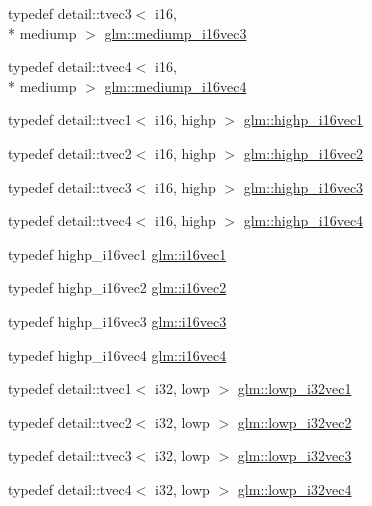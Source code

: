 \begin{DoxyCompactItemize}
\item 
typedef detail\-::tvec3$<$ i16, \\*
mediump $>$ \hyperlink{group__gtc__type__precision_gad9e470f707da812fe454505c99035471}{glm\-::mediump\-\_\-i16vec3}
\item 
typedef detail\-::tvec4$<$ i16, \\*
mediump $>$ \hyperlink{group__gtc__type__precision_gad9aca299fc3e96c84be6b063381c9f3e}{glm\-::mediump\-\_\-i16vec4}
\item 
typedef detail\-::tvec1$<$ i16, highp $>$ \hyperlink{group__gtc__type__precision_ga0ed3103e2d3acb4efbe313add4243a72}{glm\-::highp\-\_\-i16vec1}
\item 
typedef detail\-::tvec2$<$ i16, highp $>$ \hyperlink{group__gtc__type__precision_ga74df9e215c049f82d277473c4c974bb4}{glm\-::highp\-\_\-i16vec2}
\item 
typedef detail\-::tvec3$<$ i16, highp $>$ \hyperlink{group__gtc__type__precision_ga8dcfd412bd9ce99a1cf5c2b6e50f07e7}{glm\-::highp\-\_\-i16vec3}
\item 
typedef detail\-::tvec4$<$ i16, highp $>$ \hyperlink{group__gtc__type__precision_ga7fd6f1b3c224833cc330a2c64b6994dd}{glm\-::highp\-\_\-i16vec4}
\item 
typedef highp\-\_\-i16vec1 \hyperlink{group__gtc__type__precision_gaa3a2fe05ca6a7086c5580922ebda4bf3}{glm\-::i16vec1}
\item 
typedef highp\-\_\-i16vec2 \hyperlink{group__gtc__type__precision_ga13f7a88281faec6a72231dce73ce6129}{glm\-::i16vec2}
\item 
typedef highp\-\_\-i16vec3 \hyperlink{group__gtc__type__precision_ga22ec113d49837ef823048bb01511564c}{glm\-::i16vec3}
\item 
typedef highp\-\_\-i16vec4 \hyperlink{group__gtc__type__precision_ga28cd96ac55e2209bdbd3a41cb8af970a}{glm\-::i16vec4}
\item 
typedef detail\-::tvec1$<$ i32, lowp $>$ \hyperlink{group__gtc__type__precision_gadb82f1c8a0f4d3304862d32079961974}{glm\-::lowp\-\_\-i32vec1}
\item 
typedef detail\-::tvec2$<$ i32, lowp $>$ \hyperlink{group__gtc__type__precision_ga1ac855a9b4ef24908d00ab715e7ddbff}{glm\-::lowp\-\_\-i32vec2}
\item 
typedef detail\-::tvec3$<$ i32, lowp $>$ \hyperlink{group__gtc__type__precision_gaa4a0dd64d4253a3641225254670c7b95}{glm\-::lowp\-\_\-i32vec3}
\item 
typedef detail\-::tvec4$<$ i32, lowp $>$ \hyperlink{group__gtc__type__precision_ga99adefeda08a56345b0553d13283d2fa}{glm\-::lowp\-\_\-i32vec4}

\end{DoxyCompactItemize}
